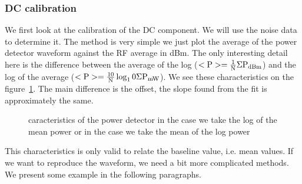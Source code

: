 \subsubsection{DC calibration}
We first look at the calibration  of the DC component. We will use the
noise data to determine it. The method is very simple we just plot the
average  of the  power detector  waveform  against the  RF average  in
dBm. The  only interesting detail  here is the difference  between the
average of the log ($\rm <P> = \frac{1}{N}\Sigma P_{dBm}$) and the log
of the  average ($\rm <P>  = \frac{10}{N} \log_10 \Sigma  P_{mW}$). We
see these  characteristics on the  figure~\ref{fig:pdcarac}.  The main
difference  is   the  offset,  the   slope  found  from  the   fit  is
approximately the same.
\begin{figure}[!ht]
  \centering
  \hspace*{-3ex}
  \caption{caracteristics of the power detector in the case we take the log of the mean power or in the case we take the mean of the log power}
  \label{fig:pdcarac}
\end{figure}
This  characteristics is  only  valid to  relate  the baseline  value,
i.e. mean values. If we want  to reproduce the waveform, we need a bit
more  complicated methods. We  present some  example in  the following
paragraphs.

